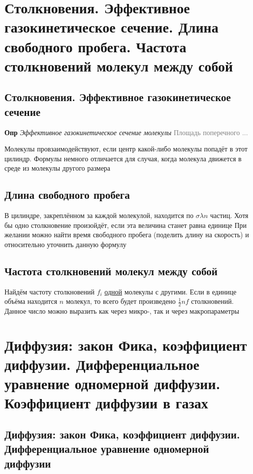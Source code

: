 \documentclass[a4paper, 14pt]{article}
\begin{document}
    \section{Столкновения. Эффективное газокинетическое сечение.
    Длина свободного пробега.
    Частота столкновений молекул между собой}

    \subsection{Столкновения. Эффективное газокинетическое сечение}

    \textbf{Опр} \textit{Эффективное газокинетическое сечение молекулы} \textcolor{gray}{Площадь поперечного ...}

    Молекулы провзаимодействуют, если центр какой-либо молекулы попадёт в этот цилиндр.
    Формулы немного отличается для случая, когда молекула движется в среде из молекулы другого размера

    \subsection{Длина свободного пробега}

    В цилиндре, закреплённом за каждой молекулой, находится по $\sigma \lambda n$ частиц.
    Хотя бы одно столкновение произойдёт, если эта величина станет равна единице
    При желании можно найти время свободного пробега (поделить длину на скорость) и относительно уточнить данную формулу

    \subsection{Частота столкновений молекул между собой}

    Найдём частоту столкновений $f_i$ \underline{одной} молекулы с другими.
    Если в единице объёма находится $n$ молекул, то всего будет произведено $\frac{1}{2} nf$ столкновений.
    Данное число можно выразить как через микро-, так и через макропараметры

    \section{Диффузия: закон Фика, коэффициент диффузии. Дифференциальное уравнение одномерной диффузии.
    Коэффициент диффузии в газах}

    \subsection{Диффузия: закон Фика, коэффициент диффузии. Дифференциальное уравнение одномерной диффузии}
\end{document}
